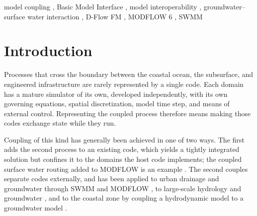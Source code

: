 \documentclass[preprint,authoryear,11pt]{elsarticle}
\begin{document}
\begin{frontmatter}
%
%
\begin{abstract}
Coastal, subsurface, and infrastructure processes are simulated by independently developed codes. Three unmodified codes---a coastal hydrodynamic model, a groundwater flow model, and a sewer network model---are loaded as libraries into one process and exchange state in memory. Returning sewer discharge to the hydrodynamic model demands most of the interface: a transfer within a model time step, undefined by the Basic Model Interface. It is demonstrated where a tidally modulated water table infiltrates a combined sewer, across three grids and intervals from 15 minutes to one day. The coastal boundary must represent the interval, not the instant: sampling it costs an order of magnitude in head at daily exchange. The error is not monotonic, being larger at 12 hours than at 24, following the period the dominant tidal constituent aliases onto. Exchanging often is inexpensive, so the interval is better chosen from the tide than from run time.
\end{abstract}

\begin{keyword}
model coupling \sep
Basic Model Interface \sep
model interoperability \sep
groundwater--surface water interaction \sep
D-Flow FM \sep
MODFLOW 6 \sep
SWMM
\end{keyword}

\end{frontmatter}

\section{Introduction}

Processes that cross the boundary between the coastal ocean, the subsurface, and engineered infrastructure are rarely represented by a single code. Each domain has a mature simulator of its own, developed independently, with its own governing equations, spatial discretization, model time step, and means of external control. Representing the coupled process therefore means making those codes exchange state while they run.

Coupling of this kind has generally been achieved in one of two ways. The first adds the second process to an existing code, which yields a tightly integrated solution but confines it to the domains the host code implements; the coupled surface water routing added to MODFLOW is an example \citep{hughes2014swr}. The second couples separate codes externally, and has been applied to urban drainage and groundwater through SWMM and MODFLOW \citep{zhang2020swmmmodflow, li2022urbansaturated, tajari2026compound}, to large-scale hydrology and groundwater \citep{guillaumot2022cwatm}, and to the coastal zone by coupling a hydrodynamic model to a groundwater model \citep{jin2025gwocean}.
\end{document}
